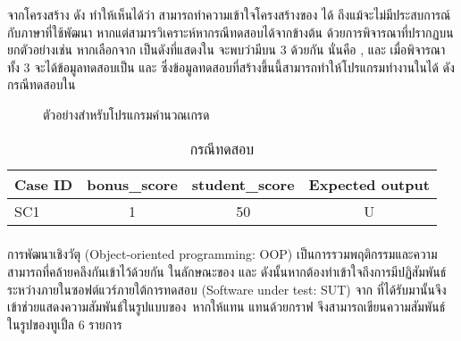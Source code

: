 {{จากโครงสร้าง{\sourcecode} ดัง{} ทำให้เห็นได้ว่า {\tester}สามารถทำความเข้าใจโครงสร้างของ{\sourcecode} ได้ 
ถึงแม้{\tester}จะไม่มีประสบการณ์กับภาษาที่ใช้พัฒนา หากแต่{\tester}สามารวิเคราะห์หากรณีทดสอบได้จาก{\cfg}ข้างต้น 
ด้วยการพิจารณา{\PredicateNode}ที่ปรากฏบน{\FirstTimeDefine{\TestPath}{\TestPathEN}} ยกตัวอย่างเช่น 
หากเลือก{\Path}จาก{} เป็น{\TestPath}ดังที่แสดงใน{} จะพบว่ามี{\PredicateNode}บน{\TestPath} 3 {\Node} 
ด้วยกัน นั่นคือ ,  และ  เมื่อพิจารณา{\PredicateNode}ทั้ง 3 {\Node}จะได้ข้อมูลทดสอบเป็น  และ 
 ซึ่งข้อมูลทดสอบที่สร้างขึ้นนี้สามารถทำให้โปรแกรมทำงานใน{\TestPath}ได้ 
ดังกรณีทดสอบใน

\clearpage
\begin{figure}[ht!]
    \centering
    \caption{ตัวอย่าง{\TestPath}สำหรับโปรแกรมคำนวณเกรด}
    \label{fig:testpath}
\end{figure}


\begin{table}[ht!]
    \centering
    \caption{กรณีทดสอบ}
    \label{tab:simpleTestCase}
    \begin{tabular}{|l|c|c|c|}
        \hline
        \rowcolor{LightGray}
        Case ID     & bonus\_score  & student\_score    & Expected output \\
        \hline
        SC1         & 1             & 50                & U \\
        \hline
    \end{tabular}
\end{table}

\subsubsection{\FirstTimeDefine{\scg}{\scgEN}}
\label{sec:sub:sub:scg}

การพัฒนา{\software}เชิงวัตุ (Object-oriented programming: OOP) เป็นการรวมพฤติกรรมและความสามารถที่คล้ายคลึงกันเข้าไว้ด้วยกัน \cite{kindler2011}
ในลักษณะของ\FirstTimeDefine{\class}{\classEN} \FirstTimeDefine{\method}{\methodEN} และ \FirstTimeDefine{\attribute}{\attributeEN} 
ดังนั้นหากต้องทำเข้าใจถึงการมีปฏิสัมพันธ์ระหว่าง{\class}ภายในซอฟต์แวร์ภายใต้การทดสอบ (Software under test: SUT) จาก{\sourcecode} 
ที่ได้รับมานั้น{\scg}จึงเข้าช่วยแสดงความสัมพันธ์ในรูปแบบของ\FirstTimeDefine{\DirectedMultiGraph}{\DirectedMultiGraphEN}\ หากให้แทน{\software}  
แทนด้วยกราฟ  จึงสามารถเขียนความสัมพันธ์ในรูปของทูเปิ้ล 6 รายการ 

}}
